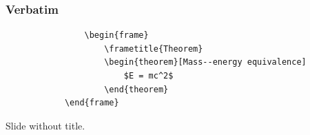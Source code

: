 \documentclass[
11pt, %
serif
]{beamer}
\begin{document}
	\begin{frame}[fragile] %
		\frametitle{Verbatim}
		
		\begin{example}
			\begin{verbatim}
				\begin{frame}
					\frametitle{Theorem}
					\begin{theorem}[Mass--energy equivalence]
						$E = mc^2$
					\end{theorem}
			\end{frame}\end{verbatim} %
		\end{example}
	\end{frame}
	
	
	\begin{frame}
		Slide without title.
	\end{frame}
	
\end{document}
